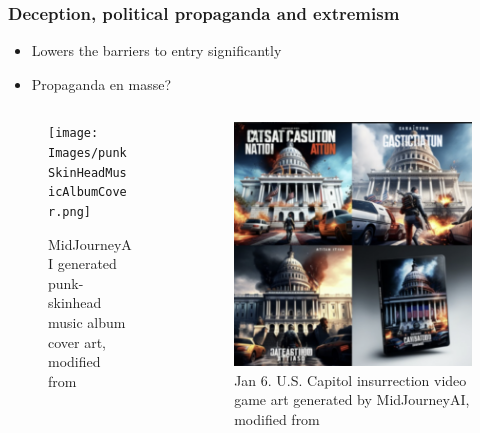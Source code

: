 \documentclass[
	11pt, compress%
]{beamer}
\begin{document}
\begin{frame}

	\frametitle{Deception, political propaganda and extremism}
	\begin{itemize}
		\setlength\itemsep{1em}
		\item Lowers the barriers to entry significantly
		\item Propaganda en masse?
	\end{itemize}
	\begin{columns}[c] 
		\begin{column}{0.5\textwidth} %
			\begin{figure}
				\texttt{[image: Images/punkSkinHeadMusicAlbumCover.png]}
				\caption{\tiny MidJourneyAI generated punk-skinhead music album cover art, modified from \cite{AIPropaganda}}
			\end{figure}
		\end{column}
		\begin{column}{0.5\textwidth} %
			\begin{figure}
				\includegraphics[width=0.6\linewidth]{Images/GameCoverArtCapitolInsurrection.png}
				\caption{\tiny Jan 6. U.S. Capitol insurrection video game art generated by MidJourneyAI, modified from \cite{AIPropaganda}} 
			\end{figure}
		\end{column}
	\end{columns}

\end{frame}
\end{document}
